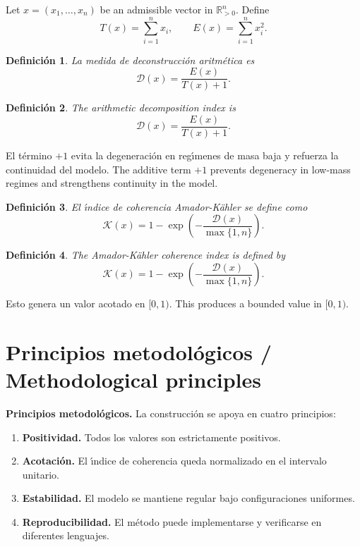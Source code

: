 \documentclass[11pt]{article}
\newtheorem{definition}{Definici\'on}
\begin{document}
Let $x=(x_1,\ldots,x_n)$ be an admissible vector in $\mathbb{R}_{>0}^n$. Define
\begin{equation}
T(x)=\sum_{i=1}^{n}x_i, \qquad E(x)=\sum_{i=1}^{n}x_i^2.
\end{equation}

\begin{definition}
La medida de deconstrucci\'on aritm\'etica es
\begin{equation}
\mathcal{D}(x)=\frac{E(x)}{T(x)+1}.
\end{equation}
\end{definition}

\begin{definition}
The arithmetic decomposition index is
\begin{equation}
\mathcal{D}(x)=\frac{E(x)}{T(x)+1}.
\end{equation}
\end{definition}

El t\'ermino $+1$ evita la degeneraci\'on en reg\'{\i}menes de masa baja y refuerza la continuidad del modelo. The additive term $+1$ prevents degeneracy in low-mass regimes and strengthens continuity in the model.

\begin{definition}
El \'{\i}ndice de coherencia Amador-K\"ahler se define como
\begin{equation}
\mathcal{K}(x)=1-\exp\left(-\frac{\mathcal{D}(x)}{\max\{1,n\}}\right).
\end{equation}
\end{definition}

\begin{definition}
The Amador-K\"ahler coherence index is defined by
\begin{equation}
\mathcal{K}(x)=1-\exp\left(-\frac{\mathcal{D}(x)}{\max\{1,n\}}\right).
\end{equation}
\end{definition}

Esto genera un valor acotado en $[0,1)$. This produces a bounded value in $[0,1)$.

\section{Principios metodol\'ogicos / Methodological principles}
\textbf{Principios metodol\'ogicos.} La construcci\'on se apoya en cuatro principios:

\begin{enumerate}[label=\textbf{P\arabic*.}]
\item \textbf{Positividad.} Todos los valores son estrictamente positivos.
\item \textbf{Acotaci\'on.} El \'{\i}ndice de coherencia queda normalizado en el intervalo unitario.
\item \textbf{Estabilidad.} El modelo se mantiene regular bajo configuraciones uniformes.
\item \textbf{Reproducibilidad.} El m\'etodo puede implementarse y verificarse en diferentes lenguajes.
\end{enumerate}
\end{document}
